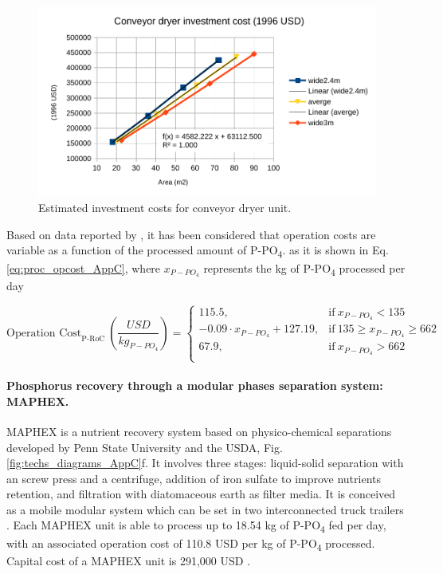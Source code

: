 \begin{refsection}[referencesCh4]
\begin{figure}[h!]
	\centering
	\includegraphics[width=0.95\linewidth]{gfx/AppendixC/converyor_dryer_investment_cost} 
	\caption{Estimated investment costs for conveyor dryer unit.}
	\label{fig:converyor_dryer_investment_cost_AppC}
\end{figure}

Based on data reported by \citet{egle_phosphorus_2016}, it has been considered that operation costs are variable as a function of the processed amount of P-PO\textsubscript{4}. as it is shown in Eq. \ref{eq:proc_opcost_AppC}, where $x_{P-PO_{4}}$ represents the kg of P-PO\textsubscript{4} processed per day

\scriptsize
\begin{equation}
\text{Operation Cost}_{\text{P-RoC}} \ \left(\frac{USD}{kg_{P-PO_{4}}}\right)=
\begin{cases}
115.5, & \text{if}\ x_{P-PO_{4}} < 135 \\
-0.09 \cdot x_{P-PO_{4}} +127.19, & \text{if} \ 135 \geq x_{P-PO_{4}} \geq 662 \\
67.9, & \text{if} \ x_{P-PO_{4}} > 662 \\
\end{cases} \label{eq:proc_opcost_AppC}
\end{equation}
\normalsize

\paragraph{Phosphorus recovery through a modular phases separation system: MAPHEX.}
MAPHEX is a nutrient recovery system based on physico-chemical separations developed by Penn State University and the USDA, Fig. \ref{fig:techs_diagrams_AppC}f. It involves three stages: liquid-solid separation with an screw press and a centrifuge, addition of iron sulfate to improve nutrients retention, and filtration with diatomaceous earth as filter media. It is conceived as a mobile modular system which can be set in two interconnected truck trailers \citep{church_novel_2016, church_versatility_2018}.
Each MAPHEX unit is able to process up to 18.54 kg of P-PO\textsubscript{4} fed per day, with an associated operation cost of 110.8 USD per kg of P-PO\textsubscript{4} processed. Capital cost of a MAPHEX unit is 291,000 USD \citep{church_novel_2016, church_versatility_2018}.


\end{refsection}
